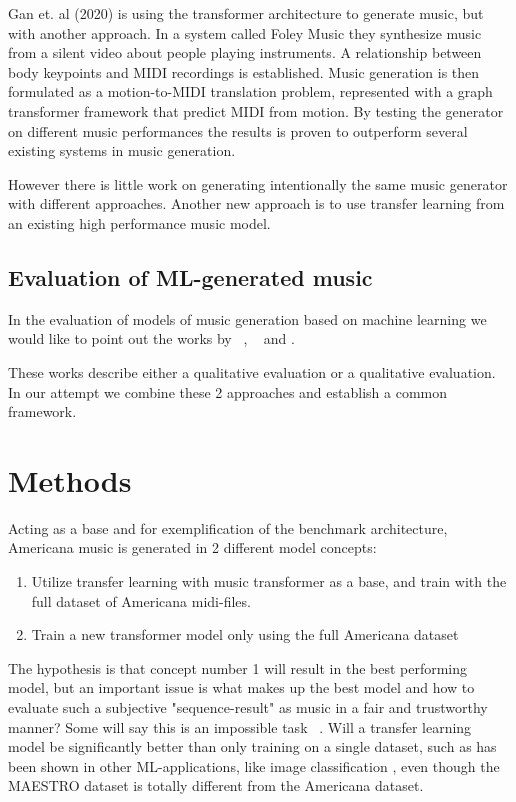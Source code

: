 \documentclass{IEEEtran}
\begin{document}
       Gan et. al (2020) \cite{ref} is using the transformer architecture to generate music, but with another approach. In a system called Foley Music they synthesize music from a silent video about people playing instruments. A relationship between body keypoints and MIDI recordings is established. Music generation is then formulated as a motion-to-MIDI translation problem, represented with a graph transformer framework that predict MIDI from motion. By testing the generator on different music performances the results is proven to outperform several existing systems in music generation.

       However there is little work on generating intentionally the same music generator with different approaches. Another new approach is to use transfer learning from an existing high performance music model.

       \subsection{Evaluation of ML-generated music}
       In the evaluation of models of music generation based on machine learning we would like to point out the works by ~\cite{1030094}, ~\cite{yang2020evaluation} and \cite{wu2020jazz}.

       These works describe either a qualitative evaluation or a qualitative evaluation. In our attempt we combine these 2 approaches and establish a common framework.

    \section{Methods}

        Acting as a base and for exemplification of the benchmark architecture,
        Americana music is generated in 2 different model concepts:
        \begin{enumerate}
            \item Utilize transfer learning with music transformer as a base, and
                    train with the full dataset of Americana midi-files.
            \item Train a new transformer model only using the full Americana dataset
        \end{enumerate} 
        
        The hypothesis is that concept number 1 will result in the best performing model,
        but an important issue is what makes up the best model and how to evaluate such a
        subjective "sequence-result" as music in a fair and trustworthy manner? 
        Some will say this is an impossible task ~\cite{1030094}. Will a transfer learning model be significantly better than only training on a single dataset, such as has been shown in other ML-applications, like image classification \cite{ref}, even though the MAESTRO dataset is totally different from the Americana dataset.
\end{document}
